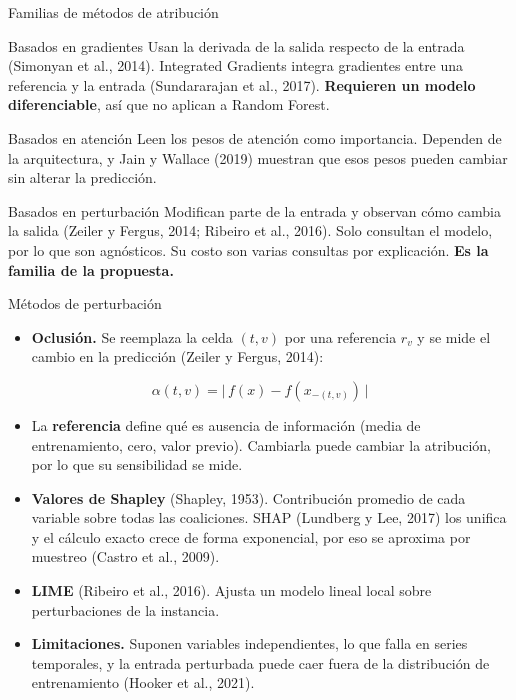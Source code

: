 \documentclass{beamer}
\begin{document}
\begin{frame}{Familias de métodos de atribución}
    \footnotesize
    \begin{block}{Basados en gradientes}
        Usan la derivada de la salida respecto de la entrada (Simonyan et
        al., 2014). Integrated Gradients integra gradientes entre una
        referencia y la entrada (Sundararajan et al., 2017).
        \textbf{Requieren un modelo diferenciable}, así que no aplican a
        Random Forest.
    \end{block}
    \begin{block}{Basados en atención}
        Leen los pesos de atención como importancia. Dependen de la
        arquitectura, y Jain y Wallace (2019) muestran que esos pesos
        pueden cambiar sin alterar la predicción.
    \end{block}
    \begin{alertblock}{Basados en perturbación}
        Modifican parte de la entrada y observan cómo cambia la salida
        (Zeiler y Fergus, 2014; Ribeiro et al., 2016). Solo consultan el
        modelo, por lo que son agnósticos. Su costo son varias consultas
        por explicación. \textbf{Es la familia de la propuesta.}
    \end{alertblock}
\end{frame}

\begin{frame}{Métodos de perturbación}
    \footnotesize
    \begin{itemize}
        \item \textbf{Oclusión.} Se reemplaza la celda $(t,v)$ por una
        referencia $r_v$ y se mide el cambio en la predicción
        (Zeiler y Fergus, 2014):
    \end{itemize}
    \[
        \alpha(t,v) = \bigl|\,f(x) - f(x_{-(t,v)})\,\bigr|
    \]
    \begin{itemize}
        \item La \textbf{referencia} define qué es ausencia de
        información (media de entrenamiento, cero, valor previo). Cambiarla
        puede cambiar la atribución, por lo que su sensibilidad se mide.
        \item \textbf{Valores de Shapley} (Shapley, 1953). Contribución
        promedio de cada variable sobre todas las coaliciones. SHAP
        (Lundberg y Lee, 2017) los unifica y el cálculo exacto crece de
        forma exponencial, por eso se aproxima por muestreo (Castro et
        al., 2009).
        \item \textbf{LIME} (Ribeiro et al., 2016). Ajusta un modelo
        lineal local sobre perturbaciones de la instancia.
        \item \textbf{Limitaciones.} Suponen variables independientes, lo
        que falla en series temporales, y la entrada perturbada puede caer
        fuera de la distribución de entrenamiento (Hooker et al., 2021).
    \end{itemize}
\end{frame}
\end{document}
